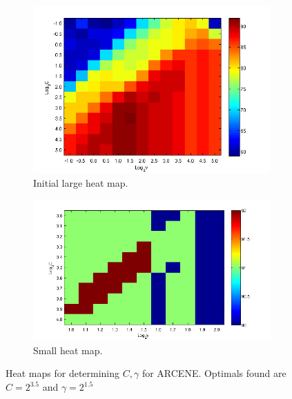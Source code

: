 \documentclass[12pt,a4paper,twocolumn]{article}
\begin{document}
\begin{figure}
        \centering
        \begin{subfigure}[b]{0.5\textwidth}
                \includegraphics[width=\textwidth]{img/heat_map_huge_cv_10.png}
                \caption{Initial large heat map.}
                \label{fig:heat_map_large}
        \end{subfigure}
        \begin{subfigure}[b]{0.5\textwidth}
           \includegraphics[width=\textwidth]{img/heat_map_small_cv_10.png}
           \caption{Small heat map.}
	 	   \label{fig:heat_map_small}
        \end{subfigure}
        \caption{{\footnotesize Heat maps for determining $C, \gamma$ for ARCENE. Optimals found are $C=2^{3.5}$ and $\gamma = 2^{1.5}$}}
        \label{fig:heat_maps}
\end{figure}
\end{document}
